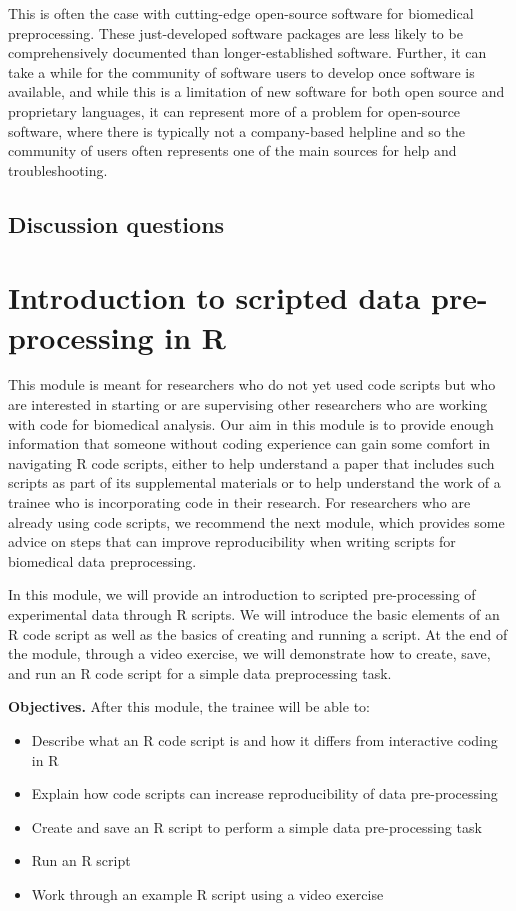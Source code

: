 \documentclass[]{tufte-book}
\providecommand{\tightlist}{%
  \setlength{\itemsep}{0pt}\setlength{\parskip}{0pt}}
\begin{document}
This is often the case with cutting-edge open-source software for biomedical
preprocessing. These just-developed software packages are less likely to be
comprehensively documented than longer-established software. Further, it can
take a while for the community of software users to develop once software is
available, and while this is a limitation of new software for both open source
and proprietary languages, it can represent more of a problem for open-source
software, where there is typically not a company-based helpline and so the
community of users often represents one of the main sources for help and
troubleshooting.

\subsection{Discussion questions}\label{discussion-questions-2}

\section{Introduction to scripted data pre-processing in R}\label{module13}

This module is meant for researchers who do not yet used code scripts but who
are interested in starting or are supervising other researchers who are working
with code for biomedical analysis. Our aim in this module is to provide enough
information that someone without coding experience can gain some comfort in
navigating R code scripts, either to help understand a paper that includes such
scripts as part of its supplemental materials or to help understand the work of
a trainee who is incorporating code in their research. For researchers who are
already using code scripts, we recommend the next module, which provides some
advice on steps that can improve reproducibility when writing scripts for
biomedical data preprocessing.

In this module, we will provide an introduction to scripted pre-processing of
experimental data through R scripts. We will introduce the basic elements of an
R code script as well as the basics of creating and running a script. At the end
of the module, through a video exercise, we will demonstrate how to create,
save, and run an R code script for a simple data preprocessing task.

\textbf{Objectives.} After this module, the trainee will be able to:

\begin{itemize}
\tightlist
\item
  Describe what an R code script is and how it differs from interactive
  coding in R
\item
  Explain how code scripts can increase reproducibility of data pre-processing
\item
  Create and save an R script to perform a simple data pre-processing task
\item
  Run an R script
\item
  Work through an example R script using a video exercise
\end{itemize}
\end{document}
